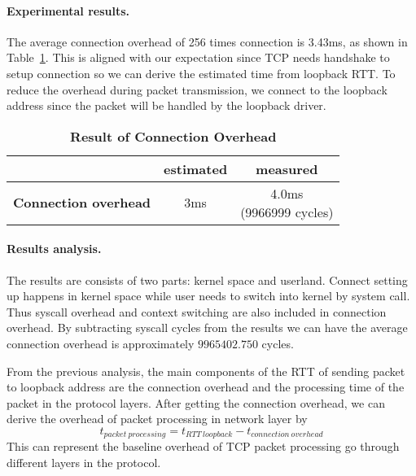 \paragraph{Experimental results.} The average connection overhead of 256 times connection is 3.43ms, as shown in Table~\ref{table:connection-overhead}. This is aligned with our expectation since TCP needs handshake to setup connection so we can derive the estimated time from loopback RTT. To reduce the overhead during packet transmission, we connect to the loopback address since the packet will be handled by the loopback driver.
\begin{table}[h]
	\centering
	\begin{tabular}{c|c|c}
		\hline
		\makecell{Type} & estimated & measured\\ \hline
        \textbf{Connection overhead} & 3ms &  \makecell{4.0ms \\ (9966999 cycles)} \\ \hline
	\end{tabular}
	\caption{\textbf{Result of Connection Overhead}}
	\label{table:connection-overhead}
\end{table}

\paragraph{Results analysis.} The results are consists of two parts: kernel space and userland. Connect setting up happens in kernel space while user needs to switch into kernel by system call. Thus syscall overhead and context switching are also included in connection overhead. By subtracting syscall cycles from the results we can have the average connection overhead is approximately $9965402.750$ cycles.

From the previous analysis, the main components of the RTT of sending packet to loopback address are the connection overhead and the processing time of the packet in the protocol layers. After getting the connection overhead, we can derive the overhead of packet processing in network layer by
\begin{equation}
    t_{packet\ processing}=t_{RTT\ loopback}-t_{connection\ overhead}
\end{equation}
This can represent the baseline overhead of TCP packet processing go through different layers in the protocol.
